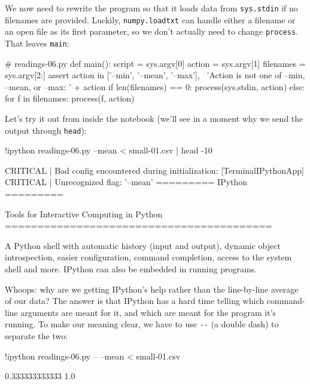\documentclass{book}
\begin{document}
We now need to rewrite the program so that it loads data from
\texttt{sys.stdin} if no filenames are provided. Luckily,
\texttt{numpy.loadtxt} can handle either a filename or an open file as
its first parameter, so we don't actually need to change
\texttt{process}. That leaves \texttt{main}:

\begin{VerbIn}
# readings-06.py
def main():
    script = sys.argv[0]
    action = sys.argv[1]
    filenames = sys.argv[2:]
    assert action in ['--min', '--mean', '--max'], \
           'Action is not one of --min, --mean, or --max: ' + action
    if len(filenames) == 0:
        process(sys.stdin, action)
    else:
        for f in filenames:
            process(f, action)
\end{VerbIn}

Let's try it out from inside the notebook (we'll see in a moment why we send the output through
\texttt{head}):

\begin{VerbIn}
!ipython readings-06.py --mean < small-01.csv | head -10
\end{VerbIn}

\begin{VerbOut}
[TerminalIPythonApp] CRITICAL | Bad config encountered during initialization:
[TerminalIPythonApp] CRITICAL | Unrecognized flag: '--mean'
=========
 IPython
=========

Tools for Interactive Computing in Python
=========================================

    A Python shell with automatic history (input and output), dynamic object
    introspection, easier configuration, command completion, access to the
    system shell and more.  IPython can also be embedded in running programs.
\end{VerbOut}

Whoops: why are we getting IPython's help rather than the line-by-line
average of our data? The answer is that IPython has a hard time telling
which command-line arguments are meant for it, and which are meant for
the program it's running. To make our meaning clear, we have to use
\texttt{-{}-} (a double dash) to separate the two:

\begin{VerbIn}
!ipython readings-06.py -- --mean < small-01.csv
\end{VerbIn}

\begin{VerbOut}
0.333333333333
1.0
\end{VerbOut}
\end{document}
